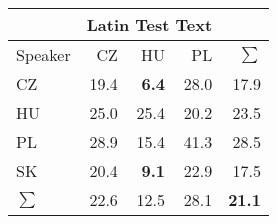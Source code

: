 \begin{tabular}{l|rrr|r}
\hline
& \multicolumn{3}{c}{Latin Test Text} & \\
\hline
 Speaker   &   CZ &   HU &   PL &   $\sum$ \\
\hline
CZ        & 19.4 &  \bf{6.4} & 28.0 &     17.9 \\
HU        & 25.0 & 25.4 & 20.2 &     23.5 \\
PL        & 28.9 & 15.4 & 41.3 &     28.5 \\
SK        & 20.4 &  \bf{9.1} & 22.9 &     17.5 \\
\hline
$\sum$   & 22.6 & 12.5 & 28.1 &     \bf{21.1} \\
\hline
\end{tabular}
